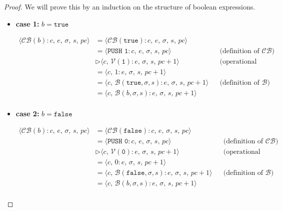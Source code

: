 \documentclass{article}
\begin{document}
\begin{proof}
We will prove this by an induction on the structure of boolean expressions.

\begin{itemize}
    \item \textbf{case 1: } $b = \texttt{true}$

    \[
      \begin{aligned}
        \langle  \mathcal{CB}(b) : c,\, e,\, \sigma,\, s,\, pc \rangle 
        &= \langle \mathcal{CB}(\texttt{true}) : c,\, e,\, \sigma,\, s,\, pc \rangle \\
        &= \langle \texttt{PUSH 1}   : c,\, e,\, \sigma,\, s,\, pc \rangle 
        && \text{(definition of $\mathcal{CB}$)} \\
        &\triangleright \langle c,\, \mathcal{V}(\texttt{1}) : e,\, \sigma,\, s,\, pc+1 \rangle 
        && \text{(operational semantics)} \\
        &= \langle c,\, 1 : e,\, \sigma,\, s,\, pc+1 \rangle  
        \\
        &= \langle c,\, \mathcal{B}(\texttt{true}, \sigma, s) : e,\, \sigma,\, s,\, pc+1 \rangle 
        && \text{(definition of $\mathcal{B}$)} \\
        &= \langle c,\, \mathcal{B}(b, \sigma, s) : e,\, \sigma,\, s,\, pc+1 \rangle \\
      \end{aligned}
  \]

    \item \textbf{case 2: } $b = \texttt{false}$

    \[
      \begin{aligned}
        \langle  \mathcal{CB}(b) : c,\, e,\, \sigma,\, s,\, pc \rangle 
        &= \langle \mathcal{CB}(\texttt{false}) : c,\, e,\, \sigma,\, s,\, pc \rangle \\
        &= \langle \texttt{PUSH 0}   : c,\, e,\, \sigma,\, s,\, pc \rangle 
        && \text{(definition of $\mathcal{CB}$)} \\
        &\triangleright \langle c,\, \mathcal{V}(\texttt{0}) : e,\, \sigma,\, s,\, pc+1 \rangle 
        && \text{(operational semantics)} \\
        &= \langle c,\, 0 : e,\, \sigma,\, s,\, pc+1 \rangle 
        \\
        &= \langle c,\, \mathcal{B}(\texttt{false}, \sigma, s) : e,\, \sigma,\, s,\, pc+1 \rangle 
        && \text{(definition of $\mathcal{B}$)} \\
        &= \langle c,\, \mathcal{B}(b, \sigma, s) : e,\, \sigma,\, s,\, pc+1 \rangle \\
      \end{aligned}
  \]
  

\end{itemize}
\end{proof}
\end{document}
